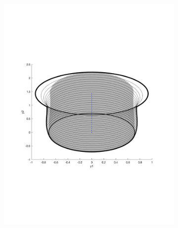 \begin{figure}
\begin{subfigure}[b]{0.3\textwidth}
        \includegraphics[width=\textwidth]{figures/experiments/FunnelSim1}
    \end{subfigure}
    \begin{subfigure}[b]{0.3\textwidth}

\end{subfigure}
\end{figure}
